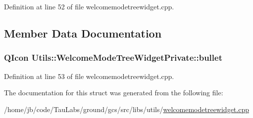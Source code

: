 \-Definition at line 52 of file welcomemodetreewidget.\-cpp.



\subsection{\-Member \-Data \-Documentation}
\hypertarget{struct_utils_1_1_welcome_mode_tree_widget_private_aea53f4bcde16dee437ac370f27766cc6}{
\subsubsection[{bullet}]{\setlength{\rightskip}{0pt plus 5cm}\-Q\-Icon {\bf \-Utils\-::\-Welcome\-Mode\-Tree\-Widget\-Private\-::bullet}}}\label{struct_utils_1_1_welcome_mode_tree_widget_private_aea53f4bcde16dee437ac370f27766cc6}


\-Definition at line 53 of file welcomemodetreewidget.\-cpp.



\-The documentation for this struct was generated from the following file\-:\begin{DoxyCompactItemize}
\item 
/home/jb/code/\-Tau\-Labs/ground/gcs/src/libs/utils/\hyperlink{welcomemodetreewidget_8cpp}{welcomemodetreewidget.\-cpp}\end{DoxyCompactItemize}
